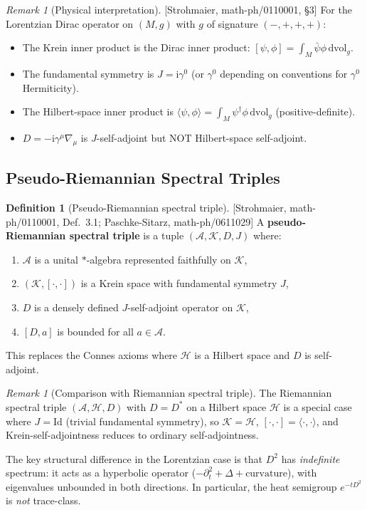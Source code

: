 \documentclass[12pt,a4paper]{article}
\theoremstyle{definition}
\newtheorem{definition}[proposition]{Definition}
\theoremstyle{remark}
\newtheorem{remark}[proposition]{Remark}
\newcommand{\ii}{\mathrm{i}}
\newcommand{\Id}{\mathrm{Id}}
\newcommand{\fromlit}[1]{\textcolor{blue!70!black}{\textsf{[#1]}}}
\begin{document}
\begin{remark}[Physical interpretation]
\fromlit{Strohmaier, math-ph/0110001, \S3}
For the Lorentzian Dirac operator on $(M,g)$ with $g$ of signature
$(-,+,+,+)$:
\begin{itemize}[nosep]
  \item The Krein inner product is the Dirac inner product:
    $[\psi,\phi] = \int_M \bar{\psi}\phi\,\mathrm{dvol}_g$.
  \item The fundamental symmetry is $J = \ii\gamma^0$ (or $\gamma^0$
    depending on conventions for $\gamma^0$ Hermiticity).
  \item The Hilbert-space inner product is $\langle\psi,\phi\rangle
    = \int_M \psi^\dagger\phi\,\mathrm{dvol}_g$ (positive-definite).
  \item $D = -\ii\gamma^\mu\nabla_\mu$ is $J$-self-adjoint but NOT
    Hilbert-space self-adjoint.
\end{itemize}
\end{remark}

\subsection{Pseudo-Riemannian Spectral Triples}

\begin{definition}[Pseudo-Riemannian spectral triple]
\label{def:pseudo-riem-st}
\fromlit{Strohmaier, math-ph/0110001, Def.~3.1; Paschke-Sitarz,
math-ph/0611029}
A \textbf{pseudo-Riemannian spectral triple} is a tuple
$(\mathcal{A}, \mathcal{K}, D, J)$ where:
\begin{enumerate}[nosep,label=(\roman*)]
  \item $\mathcal{A}$ is a unital $*$-algebra represented faithfully on
    $\mathcal{K}$,
  \item $(\mathcal{K}, [\cdot,\cdot])$ is a Krein space with
    fundamental symmetry $J$,
  \item $D$ is a densely defined $J$-self-adjoint operator on
    $\mathcal{K}$,
  \item $[D, a]$ is bounded for all $a \in \mathcal{A}$.
\end{enumerate}
This replaces the Connes axioms where $\mathcal{H}$ is a Hilbert
space and $D$ is self-adjoint.
\end{definition}

\begin{remark}[Comparison with Riemannian spectral triple]
\label{rem:comparison-riem}
The Riemannian spectral triple $(\mathcal{A}, \mathcal{H}, D)$
with $D = D^*$ on a Hilbert space $\mathcal{H}$ is a special case
where $J = \Id$ (trivial fundamental symmetry), so
$\mathcal{K} = \mathcal{H}$,
$[\cdot,\cdot] = \langle\cdot,\cdot\rangle$, and Krein-self-adjointness
reduces to ordinary self-adjointness.

The key structural difference in the Lorentzian case is that $D^2$ has
\emph{indefinite} spectrum: it acts as a hyperbolic operator
($-\partial_t^2 + \Delta + \text{curvature}$), with eigenvalues
unbounded in both directions.  In particular, the heat semigroup
$e^{-tD^2}$ is \emph{not} trace-class.
\end{remark}
\end{document}
